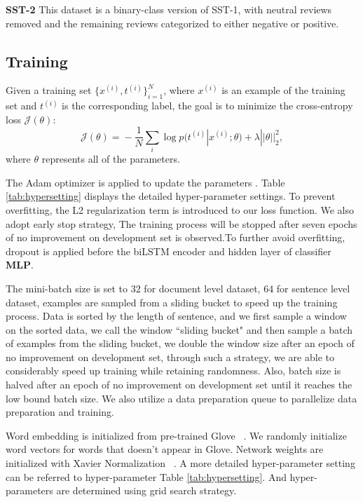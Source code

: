 \documentclass[11pt]{article}
\begin{document}
\textbf{SST-2} This dataset is a binary-class version of SST-1, with neutral reviews removed and the remaining reviews categorized to either negative or positive.




\subsection{Training}

Given a training set $\{x^{(i)}, t^{(i)}\}_{i = 1}^N$, where $x^{(i)}$ is an example of the training set and $t^{(i)}$ is the corresponding label, the goal is to minimize the cross-entropy loss $\mathcal{J}(\theta)$:
\begin{equation}
\mathcal{J}(\theta) \!=\! -\frac{1}{N}\!\!\sum_i\! \log p(t^{(i)}|x^{(i)} ; \theta) \!+\! \lambda||\theta||^2_2,
\end{equation}
where $\theta$ represents all of the parameters.

The Adam optimizer is applied to update the parameters \cite{kingma2014adam}. Table \ref{tab:hypersetting} displays the detailed hyper-parameter settings. To prevent overfitting,  the L2 regularization term is introduced to our loss function.
 We also adopt early stop strategy, The training process will be stopped after seven epochs of no improvement on development set is observed.To further avoid overfitting, dropout is applied before the biLSTM encoder and hidden layer of classifier \textbf{MLP}.

The mini-batch size is set to 32 for document level dataset, 64 for sentence level dataset, examples are sampled from a sliding bucket to speed up the training process. Data is sorted by the length of sentence, and we first sample a window on the sorted data, we call the window ``sliding bucket" and then sample a batch of examples from the sliding bucket, we double the window size after an epoch of no improvement on development set, through such a strategy, we are able to considerably speed up training while retaining randomness. Also, batch size is halved after an epoch of no improvement on development set until it reaches the low bound batch size. We also utilize a data preparation queue to parallelize data preparation and training.

Word embedding is initialized from pre-trained Glove ~\cite{pennington2014glove}.
We randomly initialize word vectors for words that doesn't appear in Glove. Network weights are initialized with Xavier Normalization ~\cite{glorot2010understanding}. 
A more detailed hyper-parameter setting can be referred to hyper-parameter Table \ref{tab:hypersetting}. And hyper-parameters are determined using grid search strategy.
\end{document}
